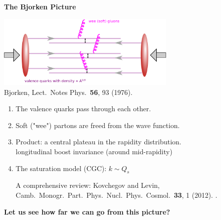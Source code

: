 \documentclass[9pt,a4paper,unknownkeysallowed,xcolor=dvipsnames,aspectratio=43]{beamer}
\begin{document}
%
%
\begin{frame}{\bf\huge The Bjorken Picture}	\vspace{4mm}
\begin{center}
\includegraphics[width=0.65\textwidth]{fig/Bjorken}\\
{\tiny  {\color{teablue}
Bjorken,
  Lect.\ Notes Phys.\  {\bf 56}, 93 (1976).
  }}
\end{center}
\begin{enumerate}
\item{\large The valence quarks pass through each other.}
\vspace{2mm}
\item{\large Soft ("wee") partons are freed from the wave function.}
\vspace{2mm}
\item{\large Product: a central plateau in the rapidity distribution.}\\
\vspace{1mm}
    {\color{darkred}longitudinal boost invariance} (around mid-rapidity)
\vspace{1mm}
\item{\large The saturation model (CGC): $k\sim Q_s$}
\begin{center}
    {\tiny  A comprehensive review: {\color{teablue}
  Kovchegov and Levin,
  Camb.\ Monogr.\ Part.\ Phys.\ Nucl.\ Phys.\ Cosmol.\  {\bf 33}, 1 (2012).
.
  }}
\end{center}
\end{enumerate}
\vspace{1mm}
\begin{center}
{\bf\large\color{darkred} Let us see how far we can go from this picture?}
\end{center}
\end{frame}
\end{document}
